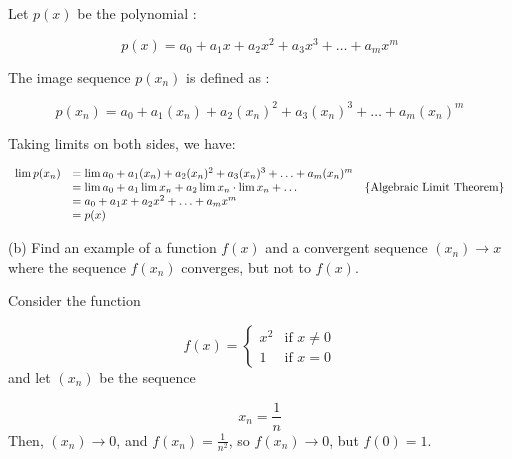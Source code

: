 \documentclass[10pt]{article}
\begin{document}
Let $\displaystyle p( x)$ be the polynomial :


\begin{equation*}
p( x) =a_{0} +a_{1} x+a_{2} x^{2} +a_{3} x^{3} +\dotsc +a_{m} x^{m}
\end{equation*}


The image sequence $\displaystyle p( x_{n})$ is defined as :


\begin{equation*}
p( x_{n}) =a_{0} +a_{1}( x_{n}) +a_{2}( x_{n})^{2} +a_{3}( x_{n})^{3} +\dotsc +a_{m}( x_{n})^{m}
\end{equation*}


Taking limits on both sides, we have:




\begin{equation*}
\begin{array}{ c l c }
\lim p( x_{n}) & =\lim a_{0} +a_{1}( x_{n}) +a_{2}( x_{n})^{2} +a_{3}( x_{n})^{3} +\dotsc +a_{m}( x_{n})^{m} & \\
 & =\lim a_{0} +a_{1}\lim x_{n} +a_{2}\lim x_{n} \cdot \lim x_{n} +\dotsc  & \left\{\text{Algebraic Limit Theorem}\right\}\\
 & =a_{0} +a_{1} x+a_{2} x^{2} +\dotsc +a_{m} x^{m} & \\
 & =p( x) & 
\end{array}
\end{equation*}


(b) Find an example of a function $\displaystyle f( x)$ and a convergent sequence $\displaystyle ( x_{n})\rightarrow x$ where the sequence $\displaystyle f( x_{n})$ converges, but not to $\displaystyle f( x)$.



Consider the function 


\begin{equation*}
f( x) =\begin{cases}
x^{2} & \text{if } x\neq 0\\
1 & \text{if } x=0
\end{cases}
\end{equation*}
and let $\displaystyle ( x_{n})$ be the sequence 


\begin{equation*}
x_{n} =\frac{1}{n}
\end{equation*}
Then, $\displaystyle ( x_{n})\rightarrow 0$, and $\displaystyle f( x_{n}) =\frac{1}{n^{2}}$, so $\displaystyle f( x_{n})\rightarrow 0$, but $\displaystyle f( 0) =1$.
\end{document}
